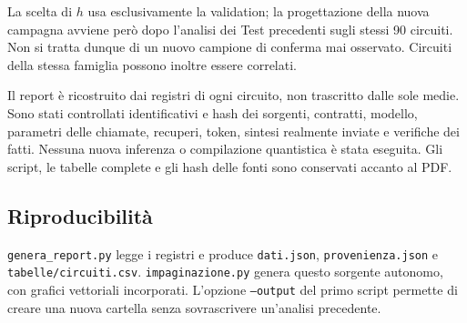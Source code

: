 \documentclass[a4paper,10pt]{article}
\begin{document}
La scelta di $h$ usa esclusivamente la validation; la progettazione della nuova
campagna avviene però dopo l'analisi dei Test precedenti sugli stessi 90 circuiti.
Non si tratta dunque di un nuovo campione di conferma mai osservato.
Circuiti della stessa famiglia possono inoltre essere correlati.

Il report è ricostruito dai registri di ogni circuito, non trascritto dalle
sole medie. Sono stati controllati identificativi e hash dei sorgenti, contratti,
modello, parametri delle chiamate, recuperi, token, sintesi realmente inviate e
verifiche dei fatti. Nessuna nuova inferenza o compilazione quantistica è stata eseguita.
Gli script, le tabelle complete e gli hash delle fonti sono conservati accanto al PDF.

\subsection{Riproducibilità}
\texttt{genera\_report.py} legge i registri e produce \texttt{dati.json},
\texttt{provenienza.json} e \texttt{tabelle/circuiti.csv}.
\texttt{impaginazione.py} genera questo sorgente autonomo, con grafici vettoriali
incorporati. L'opzione \texttt{--output} del primo script permette di creare
una nuova cartella senza sovrascrivere un'analisi precedente.
\end{document}
